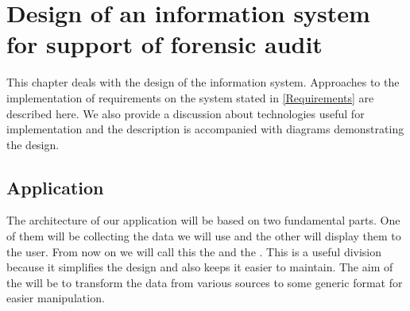 
\chapter{Design of an information system for support of forensic audit}\label {Design}
%
%
%


This chapter deals with the design of the information system. Approaches to the implementation of requirements on the system stated in \ref{Requirements} are described here. We also provide a discussion about technologies useful for implementation and the description is accompanied with diagrams demonstrating the design. 

\section{Application}

The architecture of our application will be based on two fundamental parts. One of them will be collecting the data we will use and the other will display them to the user. From now on we will call this the  and the . This is a useful division because it simplifies the design and also keeps it easier to maintain. The aim of the  will be to transform the data from various sources to some generic format for easier manipulation.

